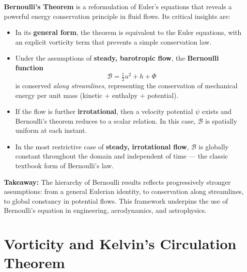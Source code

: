 \begin{bigidea}
\textbf{Bernoulli’s Theorem} is a reformulation of Euler’s equations that reveals a powerful energy conservation principle in fluid flows. Its critical insights are:

\begin{itemize}
  \item In its \textbf{general form}, the theorem is equivalent to the Euler equations, with an explicit vorticity term that prevents a simple conservation law.
  \item Under the assumptions of \textbf{steady, barotropic flow}, the \textbf{Bernoulli function}
  \[
  \mathcal{B} = \tfrac{1}{2}u^2 + h + \Phi
  \]
  is conserved \emph{along streamlines}, representing the conservation of mechanical energy per unit mass (kinetic + enthalpy + potential).
  \item If the flow is further \textbf{irrotational}, then a velocity potential $\psi$ exists and Bernoulli’s theorem reduces to a scalar relation. In this case, $\mathcal{B}$ is spatially uniform at each instant.
  \item In the most restrictive case of \textbf{steady, irrotational flow}, $\mathcal{B}$ is globally constant throughout the domain and independent of time — the classic textbook form of Bernoulli’s law.
\end{itemize}

\noindent \textbf{Takeaway:} The hierarchy of Bernoulli results reflects progressively stronger assumptions: from a general Eulerian identity, to conservation along streamlines, to global constancy in potential flows. This framework underpins the use of Bernoulli’s equation in engineering, aerodynamics, and astrophysics.
\end{bigidea}


\section{Vorticity and Kelvin's Circulation Theorem}

